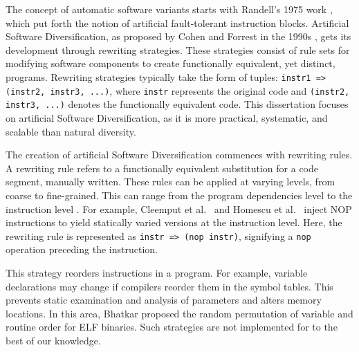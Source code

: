 \label{artificial_diversity}

The concept of automatic software variants starts with Randell's 1975 work \cite{10.1145/390016.808467}, which put forth the notion of artificial fault-tolerant instruction blocks. 
Artificial Software Diversification, as proposed by Cohen and Forrest in the 1990s \cite{cohen1993operating, 595185}, gets its development through rewriting strategies. 
These strategies consist of rule sets for modifying software components to create functionally equivalent, yet distinct, programs. 
Rewriting strategies typically take the form of tuples: \texttt{instr1 => (instr2, instr3, ...)}, where \texttt{instr} represents the original code and \texttt{(instr2, instr3, ...)} denotes the functionally equivalent code.
This dissertation focuses on artificial Software Diversification, as it is more practical, systematic, and scalable than natural diversity.


\begin{strategy}
    \label{rewriting_strategy}
    The creation of artificial Software Diversification commences with rewriting rules.
    A rewriting rule refers to a functionally equivalent substitution for a code segment, manually written. 
    These rules can be applied at varying levels, from coarse to fine-grained. 
    This can range from the program dependencies level \cite{Harrand1650630} to the instruction level \cite{offensive_div}. 
    For example, Cleemput et al.~\cite{Cleemput2012} and Homescu et al.~\cite{homescu2013profile} inject NOP instructions to yield statically varied versions at the instruction level. 
    Here, the rewriting rule is represented as \texttt{instr => (nop instr)}, signifying a \texttt{nop} operation preceding the instruction.


\end{strategy}



\begin{strategy}
    \label{instruction_reordering}
    This strategy reorders instructions in a program.
    For example, variable declarations may change if compilers reorder them in the symbol tables. 
    This prevents static examination and analysis of parameters and alters memory locations. 
    In this area, Bhatkar \etal \cite{bhatkar03, bhatkar2005efficient} proposed the random permutation of variable and routine order for ELF binaries.
    Such strategies are not implemented for \Wasm to the best of our knowledge.
\end{strategy}


